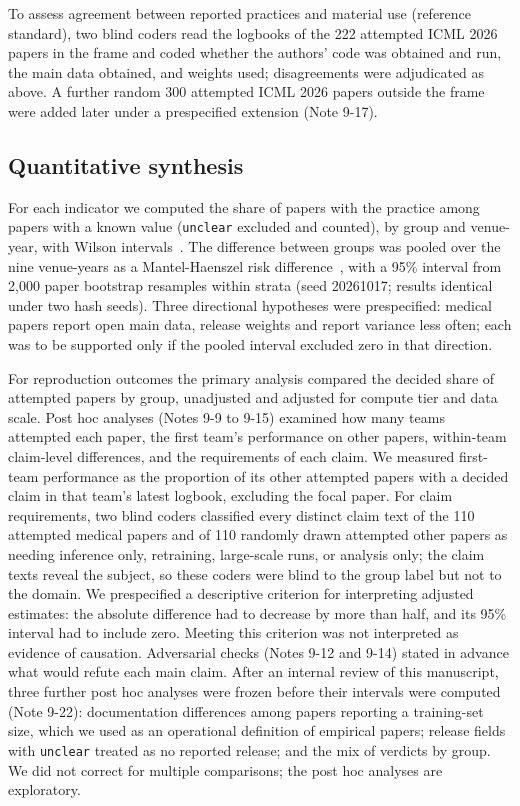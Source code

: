 \documentclass[11pt]{article}
\begin{document}
To assess agreement between reported practices and material use (reference standard), two blind coders read the logbooks of the 222 attempted ICML 2026 papers in the frame and coded whether the authors' code was obtained and run, the main data obtained, and weights used; disagreements were adjudicated as above. A further random 300 attempted ICML 2026 papers outside the frame were added later under a prespecified extension (Note 9-17).

\subsection*{Quantitative synthesis}
For each indicator we computed the share of papers with the practice among papers with a known value (\texttt{unclear} excluded and counted), by group and venue-year, with Wilson intervals~\cite{r12}. The difference between groups was pooled over the nine venue-years as a Mantel-Haenszel risk difference~\cite{r14}, with a 95\% interval from 2,000 paper bootstrap resamples within strata (seed 20261017; results identical under two hash seeds). Three directional hypotheses were prespecified: medical papers report open main data, release weights and report variance less often; each was to be supported only if the pooled interval excluded zero in that direction.

For reproduction outcomes the primary analysis compared the decided share of attempted papers by group, unadjusted and adjusted for compute tier and data scale. Post hoc analyses (Notes 9-9 to 9-15) examined how many teams attempted each paper, the first team's performance on other papers, within-team claim-level differences, and the requirements of each claim. We measured first-team performance as the proportion of its other attempted papers with a decided claim in that team's latest logbook, excluding the focal paper. For claim requirements, two blind coders classified every distinct claim text of the 110 attempted medical papers and of 110 randomly drawn attempted other papers as needing inference only, retraining, large-scale runs, or analysis only; the claim texts reveal the subject, so these coders were blind to the group label but not to the domain. We prespecified a descriptive criterion for interpreting adjusted estimates: the absolute difference had to decrease by more than half, and its 95\% interval had to include zero. Meeting this criterion was not interpreted as evidence of causation. Adversarial checks (Notes 9-12 and 9-14) stated in advance what would refute each main claim. After an internal review of this manuscript, three further post hoc analyses were frozen before their intervals were computed (Note 9-22): documentation differences among papers reporting a training-set size, which we used as an operational definition of empirical papers; release fields with \texttt{unclear} treated as no reported release; and the mix of verdicts by group. We did not correct for multiple comparisons; the post hoc analyses are exploratory.
\end{document}
